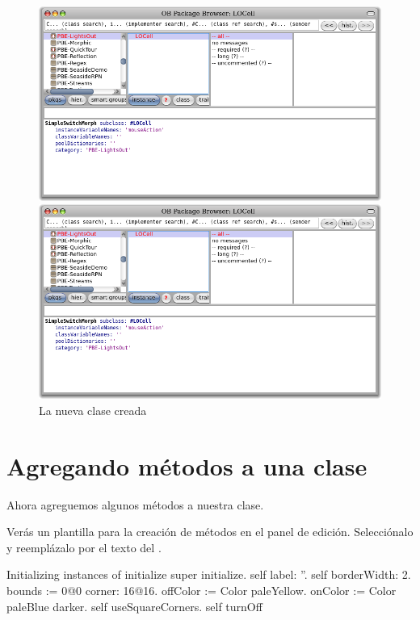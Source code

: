 \documentclass[a4paper,10pt,twoside]{book}
\begin{document}
\begin{figure}[h!t]
\ifluluelse
	{\centerline {\includegraphics[width=\textwidth]{LOCell}}}
	{\centerline {\includegraphics[scale=0.7]{LOCell}}}
\caption{La nueva clase creada }
\end{figure}


\section{Agregando m\'etodos a una clase}

Ahora agreguemos algunos m\'etodos a nuestra clase.

Ver\'as un plantilla para la creaci\'on de m\'etodos en el panel de edici\'on.
Selecci\'onalo y reempl\'azalo por el texto del .

\begin{numMethod}[scbecellinitialize]{Initializing instances of }
initialize
   super initialize.
   self label: ''.
   self borderWidth: 2.
   bounds := 0@0 corner: 16@16.
   offColor := Color paleYellow.
   onColor := Color paleBlue darker.
   self useSquareCorners.
   self turnOff
\end{numMethod}
\end{document}
